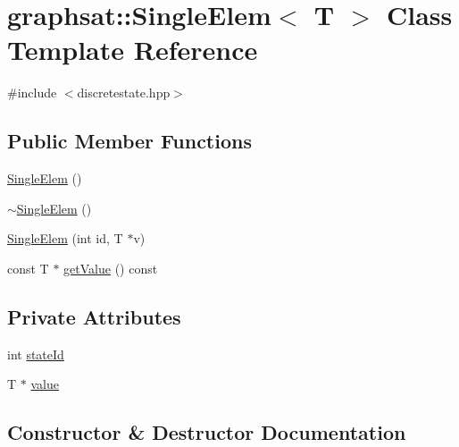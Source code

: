 \hypertarget{classgraphsat_1_1_single_elem}{}\section{graphsat\+::Single\+Elem$<$ T $>$ Class Template Reference}
\label{classgraphsat_1_1_single_elem}


{\ttfamily \#include $<$discretestate.\+hpp$>$}

\subsection*{Public Member Functions}
\begin{DoxyCompactItemize}
\item 
\mbox{\hyperlink{classgraphsat_1_1_single_elem_aacf71fbb36fbc203f4d78ed138db7ce7}{Single\+Elem}} ()
\item 
\mbox{\hyperlink{classgraphsat_1_1_single_elem_aba919de32596ee734f30eddff78c1480}{$\sim$\+Single\+Elem}} ()
\item 
\mbox{\hyperlink{classgraphsat_1_1_single_elem_a0e17aec3a48dfab80b10242282b3ebb5}{Single\+Elem}} (int id, T $\ast$v)
\item 
const T $\ast$ \mbox{\hyperlink{classgraphsat_1_1_single_elem_ae7b295b4a78a6795d39b1c7f84b7b819}{get\+Value}} () const
\end{DoxyCompactItemize}
\subsection*{Private Attributes}
\begin{DoxyCompactItemize}
\item 
int \mbox{\hyperlink{classgraphsat_1_1_single_elem_a3f64d905cbd97d553466f6cd500c6b38}{state\+Id}}
\item 
T $\ast$ \mbox{\hyperlink{classgraphsat_1_1_single_elem_af5018954efd6cfa86cb5ea4bec5859f9}{value}}
\end{DoxyCompactItemize}


\subsection{Constructor \& Destructor Documentation}
\mbox{\label{classgraphsat_1_1_single_elem_aacf71fbb36fbc203f4d78ed138db7ce7}} 
